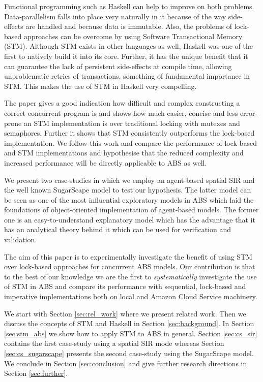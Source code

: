 Functional programming such as Haskell \citep{hudak_history_2007} can help to improve on both problems. Data-parallelism falls into place very naturally in it because of the way side-effects are handled and because data is immutable. Also, the problems of lock-based approaches can be overcome by using Software Transactional Memory (STM). Although STM exists in other languages as well, Haskell was one of the first to natively build it into its core. Further, it has the unique benefit that it can guarantee the lack of persistent side-effects at compile time, allowing unproblematic retries of transactions, something of fundamental importance in STM. This makes the use of STM in Haskell very compelling.

The paper \cite{discolo_lock_2006} gives a good indication how difficult and complex constructing a correct concurrent program is and shows how much easier, concise and less error-prone an STM implementation is over traditional locking with mutexes and semaphores. Further it shows that STM consistently outperforms the lock-based implementation. We follow this work and compare the performance of lock-based and STM implementations and hypothesise that the reduced complexity and increased performance will be directly applicable to ABS as well.

We present two case-studies in which we employ an agent-based spatial SIR \citep{macal_agent-based_2010, thaler_pure_2019} and the well known SugarScape \citep{epstein_growing_1996} model to test our hypothesis. The latter model can be seen as one of the most influential exploratory models in ABS which laid the foundations of object-oriented implementation of agent-based models. The former one is an easy-to-understand explanatory model which has the advantage that it has an analytical theory behind it which can be used for verification and validation. 

The aim of this paper is to experimentally investigate the benefit of using STM over lock-based approaches for concurrent ABS models. Our contribution is that to the best of our knowledge we are the first to \textit{systematically} investigate the use of STM in ABS and compare its performance with sequential, lock-based and imperative implementations both on local and Amazon Cloud Service machinery.

We start with Section \ref{sec:rel_work} where we present related work. Then we discuss the concepts of STM and Haskell in Section \ref{sec:background}. In Section \ref{sec:stm_abs} we show how to apply STM to ABS in general. Section \ref{sec:cs_sir} contains the first case-study using a spatial SIR mode whereas Section \ref{sec:cs_sugarscape} presents the second case-study using the SugarScape model. We conclude in Section \ref{sec:conclusion} and give further research directions in Section \ref{sec:further}.